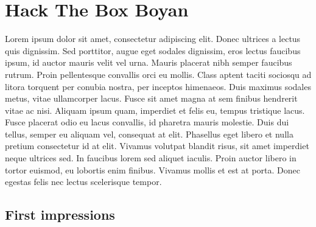 \documentclass[../main.tex]{subfiles}
\begin{document}
\section{Hack The Box Boyan}

Lorem ipsum dolor sit amet, consectetur adipiscing elit. Donec ultrices a lectus quis dignissim. Sed porttitor, augue eget sodales dignissim, eros lectus faucibus ipsum, id auctor mauris velit vel urna. Mauris placerat nibh semper faucibus rutrum. Proin pellentesque convallis orci eu mollis. Class aptent taciti sociosqu ad litora torquent per conubia nostra, per inceptos himenaeos. Duis maximus sodales metus, vitae ullamcorper lacus. Fusce sit amet magna at sem finibus hendrerit vitae ac nisi. Aliquam ipsum quam, imperdiet et felis eu, tempus tristique lacus. Fusce placerat odio eu lacus convallis, id pharetra mauris molestie. Duis dui tellus, semper eu aliquam vel, consequat at elit. Phasellus eget libero et nulla pretium consectetur id at elit. Vivamus volutpat blandit risus, sit amet imperdiet neque ultrices sed. In faucibus lorem sed aliquet iaculis. Proin auctor libero in tortor euismod, eu lobortis enim finibus. Vivamus mollis et est at porta. Donec egestas felis nec lectus scelerisque tempor.

\subsection{First impressions}
\end{document}
